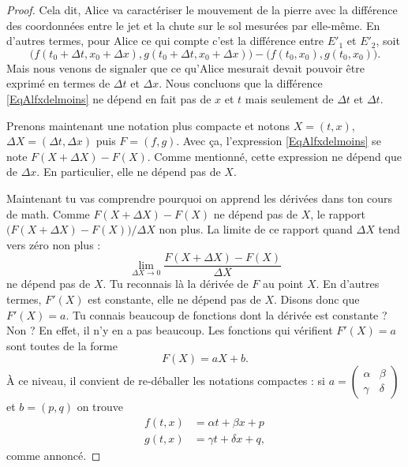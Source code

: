 \begin{proof}
	Cela dit, Alice va caractériser le mouvement de la pierre avec la différence des coordonnées entre le jet et la chute sur le sol mesurées par elle-même. En d'autres termes, pour Alice ce qui compte c'est la différence entre \( E'_1\) et \( E'_2\), soit
	\begin{equation}	\label{EqAlfxdelmoins}
		\big( f(t_0+\Delta t,x_0+\Delta x), g(t_0+\Delta t,x_0+\Delta x) \big)-\big( f(t_0,x_0),g(t_0,x_0) \big).
	\end{equation}
	Mais nous venons de signaler que ce qu'Alice mesurait devait pouvoir être exprimé en termes de \( \Delta t\) et \( \Delta x\). Nous concluons que la différence \eqref{EqAlfxdelmoins} ne dépend en fait pas de \( x\) et \( t\) mais seulement de \( \Delta t\) et \( \Delta t\).

	Prenons maintenant une notation plus compacte et notons \( X=(t,x)\), \( \Delta X=(\Delta t,\Delta x)\) puis \( F=(f,g)\). Avec ça, l'expression \eqref{EqAlfxdelmoins} se note \( F(X+\Delta X)-F(X)\). Comme mentionné, cette expression ne dépend que de \( \Delta x\). En particulier, elle ne dépend pas de \( X\).

	Maintenant tu vas comprendre pourquoi on apprend les dérivées dans ton cours de math. Comme \( F(X+\Delta X)-F(X)\) ne dépend pas de \( X\), le rapport \( \big( F(X+\Delta X)-F(X) \big)/\Delta X\) non plus. La limite de ce rapport quand \( \Delta X\) tend vers zéro non plus :
	\begin{equation}
		\lim_{\Delta X\to 0}\frac{ F(X+\Delta X)-F(X) }{ \Delta X }
	\end{equation}
	ne dépend pas de \( X\). Tu reconnais là la dérivée de \( F\) au point \( X\). En d'autres termes, \( F'(X)\) est constante, elle ne dépend pas de \( X\). Disons donc que \( F'(X)=a\). Tu connais beaucoup de fonctions dont la dérivée est constante ? Non ? En effet, il n'y en a pas beaucoup. Les fonctions qui vérifient \( F'(X)=a\) sont toutes de la forme
	\[
		F(X)=aX+b.
	\]
	À ce niveau, il convient de re-déballer les notations compactes : si \( a=\begin{pmatrix}
		\alpha & \beta \\\gamma&\delta
	\end{pmatrix}\) et \( b=(p,q)\) on trouve
	\begin{subequations}		\label{EqLoUn}
		\begin{align}
			f(t,x) & =\alpha t+\beta x+p   \\
			g(t,x) & =\gamma t+\delta x+q,
		\end{align}
	\end{subequations}
	comme annoncé.

\end{proof}


